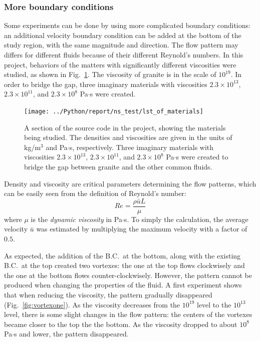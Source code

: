 \documentclass[12pt]{article}
\numberwithin{figure}{section}  %
\numberwithin{equation}{section}  %
\begin{document}
\begin{multicols}{2}
\subsubsection{More boundary conditions}

Some experiments can be done by using more complicated boundary conditions: an additional velocity boundary condition can be added at the bottom of the study region, with the same magnitude and direction. The flow pattern may differs for different fluids because of their different Reynold's numbers. In this project, behaviors of the matters with significantly different viscosities were studied, as shown in Fig.\ \ref{fig:materials}. The viscosity of granite is in the scale of $10^{19}$. In order to bridge the gap, three imaginary materials with viscosities $2.3\times10^{13}$, $2.3\times10^{11}$, and $2.3\times10^{8}$ Pa$\cdot$s were created.

\begin{figure}[!htb]
	\centering
	\texttt{[image: ../Python/report/ns\_test/lst\_of\_materials]}
	\caption{A section of the source code in the project, showing the materials being studied. The densities and viscosities are given in the units of kg/m$^3$ and Pa$\cdot$s, respectively. Three imaginary materials with viscosities $2.3\times10^{13}$, $2.3\times10^{11}$, and $2.3\times10^{8}$ Pa$\cdot$s were created to bridge the gap between granite and the other common fluids.}
	\label{fig:materials}
\end{figure}

Density and viscosity are critical parameters determining the flow patterns, which can be easily seen from the definition of Reynold's number:
\begin{equation}\label{eq:reynolds}
	Re = \dfrac{\rho\bar{u}L}{\mu}
\end{equation}
where $\mu$ is the \emph{dynamic viscosity} in Pa$\cdot$s. To simply the calculation, the average velocity $\bar{u}$ was estimated by multiplying the maximum velocity with a factor of $0.5$.

As expected, the addition of the B.C.\ at the bottom, along with the existing B.C.\ at the top created two vortexes: the one at the top flows clockwisely and the one at the bottom flows counter-clockwisely. However, the pattern cannot be produced when changing the properties of the fluid. A first experiment shows that when reducing the viscosity, the pattern gradually disappeared (Fig.\ \ref{fig:vortexone}). As the viscosity decreases from the $10^{19}$ level to the $10^{13}$ level, there is some slight changes in the flow pattern: the centers of the vortexes became closer to the top the the bottom. As the viscosity dropped to about $10^8$ Pa$\cdot$s and lower, the pattern disappeared.


\end{multicols}
\end{document}
